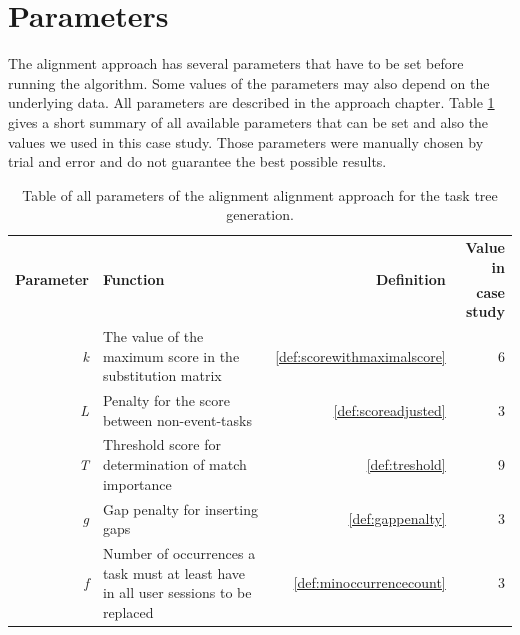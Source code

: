 \section{Parameters}
The alignment approach has several parameters that have to be set before running the algorithm. Some values of the parameters may also depend on the underlying data.
All parameters are described in the approach chapter. Table \ref{tab:parameters} gives a short summary of all available parameters that can be set and also the values
we used in this case study. Those parameters were manually chosen by trial and error and do not guarantee the best possible results.

\begin{table}
	\begin{tabularx}{\textwidth}{ r X r r}
	   \toprule
		\multirow{2}{*}{\textbf{Parameter}} & \multirow{2}{*}{\textbf{Function}} & \multirow{2}{*}{\textbf{Definition}} & \textbf{Value in} \\
		& & &\textbf{case study}\\
	     \midrule
	       \emph{k} & The value of the maximum score in the substitution matrix& \ref{def:scorewithmaximalscore}& 6  \\
			 \noalign{\medskip}
	       \emph{L} & Penalty for the score between non-event-tasks & \ref{def:scoreadjusted} & 3 \\
	      \noalign{\medskip}
			 \emph{T} & Threshold score for determination of match importance & \ref{def:treshold} & 9\\
	      \noalign{\medskip}
			\emph{g} & Gap penalty for inserting gaps & \ref{def:gappenalty} & 3 \\
	      \noalign{\medskip}
			 \emph{f} & Number of occurrences a task must at least have in all user sessions to be replaced & \ref{def:minoccurrencecount} &3\\
	       \bottomrule
 \end{tabularx}
 \caption{Table of all parameters of the alignment alignment approach for the task tree generation.}
 \label{tab:parameters}
 \end{table}


